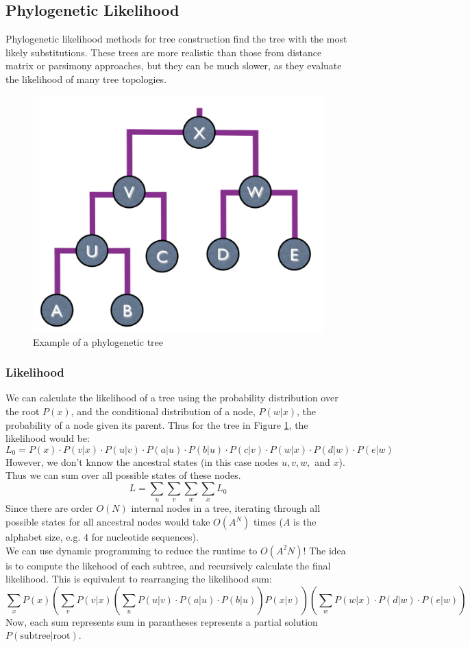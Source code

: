\documentclass[12pt]{article}
\begin{document}
\subsection{Phylogenetic Likelihood}
Phylogenetic likelihood methods for tree construction find the tree with the most likely substitutions. These trees are more realistic than those from distance matrix or parsimony approaches, but they can be much slower, as they evaluate the likelihood of many tree topologies.
\begin{figure}[h]
    \centering
    \includegraphics[width=.5\linewidth]{tree.png}
    \caption{Example of a phylogenetic tree}
    \label{fig:tree}
\end{figure}
\subsubsection{Likelihood}
We can calculate the likelihood of a tree using the probability distribution over the root $P(x)$, and the conditional distribution of a node, $P(w|x)$, the probability of a node given its parent. Thus for the tree in Figure \ref{fig:tree}, the likelihood would be:
$$L_0 = P(x) \cdot P(v|x) \cdot P(u|v) \cdot P(a|u) \cdot P(b|u) \cdot P(c|v) \cdot P(w|x) \cdot P(d|w) \cdot P(e|w)$$
However, we don't knnow the ancestral states (in this case nodes $u, v, w, $ and $x$). Thus we can sum over all possible states of these nodes.
$$L = \sum_u\sum_v\sum_w\sum_xL_0$$
Since there are order $O(N)$ internal nodes in a tree, iterating through all possible states for all ancestral nodes would take $O(A^N)$ times ($A$ is the alphabet size, e.g. 4 for nucleotide sequences).\\[10pt]
We can use dynamic programming to reduce the runtime to $O(A^2N)$! The idea is to compute the likehood of each subtree, and recursively calculate the final likelihood. This is equivalent to rearranging the likelihood sum:
$$\sum_x P(x) \left(\sum_v P(v|x)\left(\sum_u P(u|v) \cdot P(a|u) \cdot P(b|u)\right) P(x|v) \right)\left(\sum_w P(w|x)\cdot P(d|w) \cdot P(e|w)\right)$$
Now, each sum represents sum in parantheses represents a partial solution $P(\text{subtree} | \text{root})$.
\end{document}
